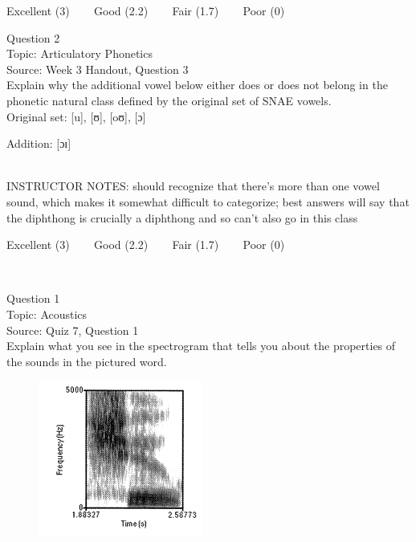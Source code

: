 \documentclass[12pt]{article}
\begin{document}
\vfill
Excellent (3) ~~~ Good (2.2) ~~~ Fair (1.7) ~~~ Poor (0)
\newpage

{\large Question 2}\\

Topic: Articulatory Phonetics\\
Source: Week 3 Handout, Question 3\\

Explain why the additional vowel below either does or does not belong in the phonetic natural class defined by the original set of SNAE vowels.\\

Original set: {[u]}, {[ʊ]}, {[oʊ]}, {[ɔ]}

Addition: {[ɔɪ]}


~\\
INSTRUCTOR NOTES: should recognize that there's more than one vowel sound, which makes it somewhat difficult to categorize; best answers will say that the diphthong is crucially a diphthong and so can't also go in this class


\vfill
Excellent (3) ~~~ Good (2.2) ~~~ Fair (1.7) ~~~ Poor (0)
\newpage

\begin{center}
\textbf{{\color{red}{\HUGE END OF EXAM}}}\\

\end{center}
\newpage

\begin{center}
\textbf{{\color{blue}{\HUGE START OF EXAM\\}}}

\textbf{{\color{blue}{\HUGE Student ID: 67125\\}}}

\textbf{{\color{blue}{\HUGE 4:30\\}}}

\end{center}
\newpage

{\large Question 1}\\

Topic: Acoustics\\
Source: Quiz 7, Question 1\\

Explain what you see in the spectrogram that tells you about the properties of the sounds in the pictured word.\\

\begin{figure}[H]
\includegraphics{../images/spectrogram_shoe.png}
\end{figure}
\end{document}

